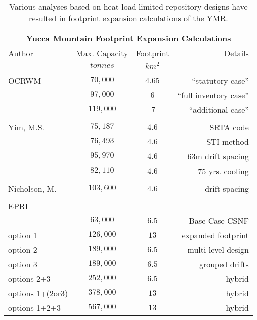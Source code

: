 \begin{table}[h!]
  \centering
      \footnotesize{
      \begin{tabular}{|l|c|c|r|}
          \multicolumn{4}{c}{\textbf{Yucca Mountain Footprint Expansion Calculations}}\\
          \hline
          Author&Max. Capacity&Footprint&Details\\
          &$tonnes$&$km^2$&\\
          \hline
          &&&\\
          OCRWM&$70,000$&$4.65$&``statutory case''\\
          &$97,000$&$6$&``full inventory case''\\
          &$119,000$&$~7$&``additional case''\\
          \hline
          &&&\\
          Yim, M.S.&$75,187$&$4.6$&SRTA code\\
          &$76,493$&$4.6$&STI method\\
          &$95,970$&$4.6$&$63$m drift spacing\\
          &$82,110$&$4.6$&75 yrs. cooling\\
          \hline
          &&&\\
          Nicholson, M.&$103,600$&$4.6$&drift spacing\\
          \hline
          &&&\\
          EPRI&&&\\
          &$63,000$&$6.5$&Base Case CSNF\\
          option 1&$126,000$&$13$&expanded footprint\\
          option 2&$189,000$&$6.5$&multi-level design\\
          option 3&$189,000$&$6.5$&grouped drifts\\
          options 2+3&$252,000$&$6.5$&hybrid\\
          options 1+(2or3) &$378,000$&$13$&hybrid\\
          options 1+2+3 &$567,000$&$13$&hybrid\\
          \hline
        \end{tabular}
        \caption[Yucca Mountain footprint expansion calculations.]{Various analyses based on heat 
        load limited repository designs have resulted in footprint expansion calculations of the 
        YMR.} 
        \label{tab:footprint}
        }
      \end{table}
